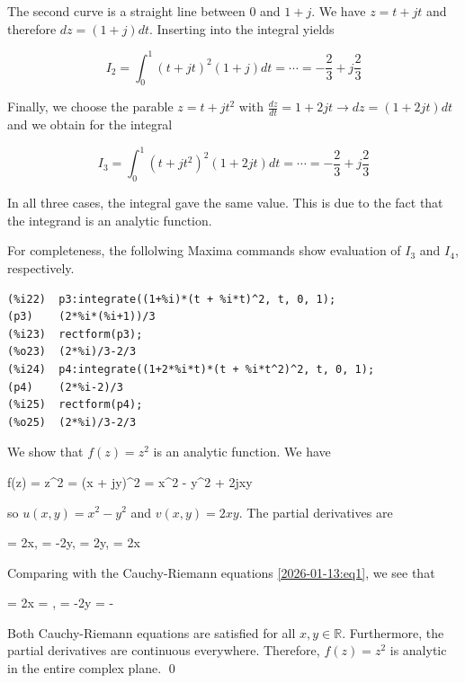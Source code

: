 The second curve is a straight line between $0$ and $1+j$. We have $z = t + j t$ and therefore $dz = (1+j) dt$. Inserting into the integral yields

\begin{equation*}
    I_{2} = \int_0^1 (t + jt)^2 (1+j) dt = \cdots = -\frac{2}{3} + j\frac{2}{3}
\end{equation*}

Finally, we choose the parable $z = t + jt^2$ with $\frac{dz}{dt} = 1 + 2jt \rightarrow dz = (1+2jt) dt$ and we obtain for the integral

\begin{equation*}
    I_{3} = \int_0^1 (t + jt^2)^2 (1+2jt) dt = \cdots = -\frac{2}{3} + j\frac{2}{3}
\end{equation*}

In all three cases, the integral gave the same value. This is due to the fact that the integrand is an analytic function.

For completeness, the follolwing Maxima commands show evaluation of $I_3$ and $I_4$, respectively.

\begin{verbatim}
(%i22)	p3:integrate((1+%i)*(t + %i*t)^2, t, 0, 1);
(p3)	(2*%i*(%i+1))/3
(%i23)	rectform(p3);
(%o23)	(2*%i)/3-2/3
(%i24)	p4:integrate((1+2*%i*t)*(t + %i*t^2)^2, t, 0, 1);
(p4)	(2*%i-2)/3
(%i25)	rectform(p4);
(%o25)	(2*%i)/3-2/3
\end{verbatim}

We show that $f(z) = z^2$ is an analytic function. We have

\bee
f(z) = z^2 = (x + jy)^2 = x^2 - y^2 + 2jxy
\eee

so $u(x,y) = x^2 - y^2$ and $v(x,y) = 2xy$. The partial derivatives are

\bee
{} = 2x, \quad {} = -2y, \quad {} = 2y, \quad {} = 2x
\eee

Comparing with the Cauchy-Riemann equations \eqref{2026-01-13:eq1}, we see that

\bee
{} = 2x = , \quad {} = -2y = - 
\eee

Both Cauchy-Riemann equations are satisfied for all $x, y \in \mathbb{R}$. Furthermore, the partial derivatives are continuous everywhere. Therefore, $f(z) = z^2$ is analytic in the entire complex plane. \qed


